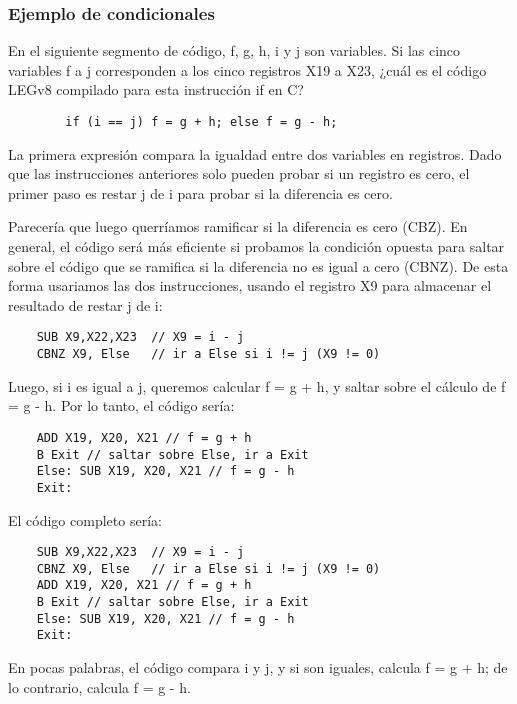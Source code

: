 \documentclass[aspectradio=43]{beamer}
\begin{document}
\begin{frame}[containsverbatim]
    \frametitle{Ejemplo de condicionales}
    En el siguiente segmento de código, f, g, h, i y j son variables. Si las cinco variables f a j corresponden a los cinco registros X19 a X23, ¿cuál es el código LEGv8 compilado para esta instrucción if en C?\\
    \begin{verbatim}
        if (i == j) f = g + h; else f = g - h;
    \end{verbatim}
    La primera expresión compara la igualdad entre dos variables en registros. Dado que las instrucciones anteriores solo pueden probar si un registro es cero, el primer paso es restar j de i para probar si la diferencia es cero.
\end{frame}

\begin{frame}[containsverbatim]
    Parecería que luego querríamos ramificar si la diferencia es cero (CBZ). En general, el código será más eficiente si probamos la condición opuesta para saltar sobre el código que se ramifica si la diferencia no es igual a cero (CBNZ). De esta forma usariamos las dos instrucciones, usando el registro X9 para almacenar el resultado de restar j de i:
    \begin{verbatim}
    SUB X9,X22,X23  // X9 = i - j
    CBNZ X9, Else   // ir a Else si i != j (X9 != 0)
    \end{verbatim}
\end{frame}

\begin{frame}[containsverbatim] 
    Luego, si i es igual a j, queremos calcular f = g + h, y saltar sobre el cálculo de f = g - h. Por lo tanto, el código sería:
    \begin{verbatim}
    ADD X19, X20, X21 // f = g + h
    B Exit // saltar sobre Else, ir a Exit
    Else: SUB X19, X20, X21 // f = g - h
    Exit:
    \end{verbatim}
\end{frame}

\begin{frame}[containsverbatim]
    El código completo sería:
    \begin{verbatim}
    SUB X9,X22,X23  // X9 = i - j
    CBNZ X9, Else   // ir a Else si i != j (X9 != 0)
    ADD X19, X20, X21 // f = g + h
    B Exit // saltar sobre Else, ir a Exit
    Else: SUB X19, X20, X21 // f = g - h
    Exit:
    \end{verbatim}
    En pocas palabras, el código compara i y j, y si son iguales, calcula f = g + h; de lo contrario, calcula f = g - h.
\end{frame}
\end{document}

